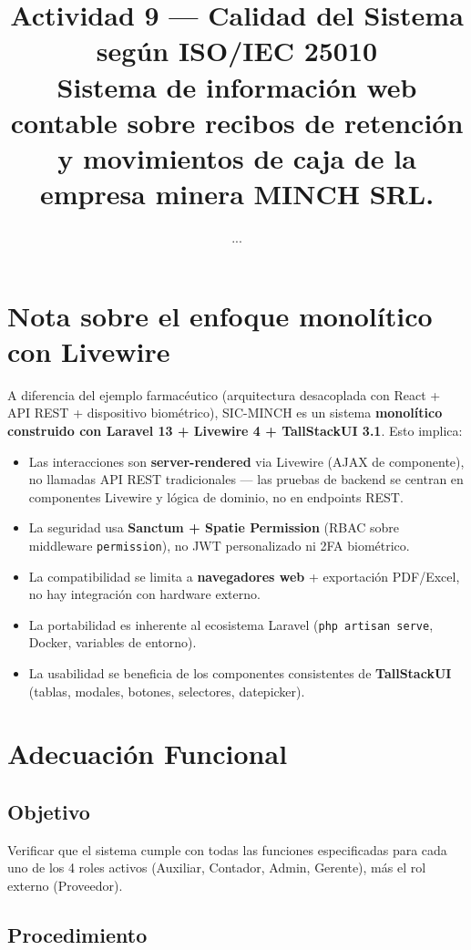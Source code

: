 \documentclass[stu]{apa7}
\title{Actividad 9 --- Calidad del Sistema según ISO/IEC 25010 \\ Sistema de información web contable sobre recibos de retención y movimientos de caja de la empresa minera MINCH SRL.}
\author{...}
\affiliation{...}
\begin{document}
\maketitle

\section*{Nota sobre el enfoque monolítico con Livewire}

A diferencia del ejemplo farmacéutico (arquitectura desacoplada con React + API REST + dispositivo biométrico), SIC-MINCH es un sistema \textbf{monolítico construido con Laravel 13 + Livewire 4 + TallStackUI 3.1}. Esto implica:

\begin{itemize}
    \item Las interacciones son \textbf{server-rendered} via Livewire (AJAX de componente), no llamadas API REST tradicionales --- las pruebas de backend se centran en componentes Livewire y lógica de dominio, no en endpoints REST.
    \item La seguridad usa \textbf{Sanctum + Spatie Permission} (RBAC sobre middleware \texttt{permission}), no JWT personalizado ni 2FA biométrico.
    \item La compatibilidad se limita a \textbf{navegadores web} + exportación PDF/Excel, no hay integración con hardware externo.
    \item La portabilidad es inherente al ecosistema Laravel (\texttt{php artisan serve}, Docker, variables de entorno).
    \item La usabilidad se beneficia de los componentes consistentes de \textbf{TallStackUI} (tablas, modales, botones, selectores, datepicker).
\end{itemize}

\section{Adecuación Funcional}

\subsection{Objetivo}

Verificar que el sistema cumple con todas las funciones especificadas para cada uno de los 4 roles activos (Auxiliar, Contador, Admin, Gerente), más el rol externo (Proveedor).

\subsection{Procedimiento}
\end{document}
